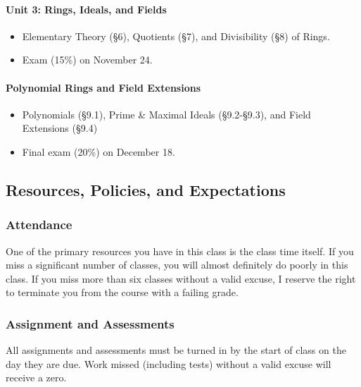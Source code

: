 \documentclass[
  twoside]{article}
\providecommand{\tightlist}{%
  \setlength{\itemsep}{0pt}\setlength{\parskip}{0pt}}
\begin{document}
\paragraph{Unit 3: Rings, Ideals, and
Fields}\label{unit-3-rings-ideals-and-fields}

\begin{itemize}
\tightlist
\item
  Elementary Theory (§6), Quotients (§7), and Divisibility (§8) of
  Rings.
\item
  Exam (15\%) on November 24.
\end{itemize}

\paragraph{Polynomial Rings and Field
Extensions}\label{polynomial-rings-and-field-extensions}

\begin{itemize}
\tightlist
\item
  Polynomials (§9.1), Prime \& Maximal Ideals (§9.2-§9.3), and Field
  Extensions (§9.4)
\item
  Final exam (20\%) on December 18.
\end{itemize}

\subsection{Resources, Policies, and
Expectations}\label{resources-policies-and-expectations}

\subsubsection{Attendance}\label{attendance}

One of the primary resources you have in this class is the class time
itself. If you miss a significant number of classes, you will almost
definitely do poorly in this class. If you miss more than six classes
without a valid excuse, I reserve the right to terminate you from the
course with a failing grade.

\subsubsection{Assignment and
Assessments}\label{assignment-and-assessments}

All assignments and assessments must be turned in by the start of class
on the day they are due. Work missed (including tests) without a valid
excuse will receive a zero.
\end{document}

